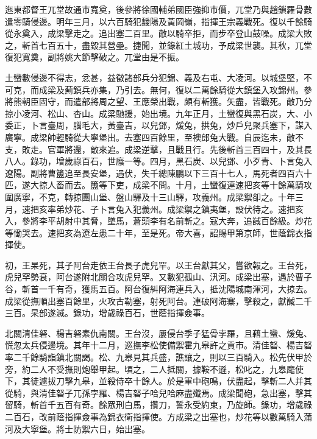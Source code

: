 \begin{pinyinscope}
迤東都督王兀堂故通市寬奠，後參將徐國輔弟國臣強抑市價，兀堂乃與趙鎖羅骨數遣零騎侵邊。明年三月，以六百騎犯靉陽及黃岡嶺，指揮王宗義戰死。復以千餘騎從永奠入，成梁擊走之。追出塞二百里。敵以騎卒拒，而步卒登山鼓噪。成梁大敗之，斬首七百五十，盡毀其營壘。捷聞，並錄紅土城功，予成梁世襲。其秋，兀堂復犯寬奠，副將姚大節擊破之。兀堂由是不振。

土蠻數侵邊不得志，忿甚，益徵諸部兵分犯錦、義及右屯、大凌河。以城堡堅，不可克，而成梁及薊鎮兵亦集，乃引去。無何，復以二萬餘騎從大鎮堡入攻錦州。參將熊朝臣固守，而遣部將周之望、王應榮出戰，頗有斬獲。矢盡，皆戰死。敵乃分掠小凌河、松山、杏山。成梁馳援，始出境。九年正月，土蠻復與黑石炭，大、小委正，卜言臺周，腦毛大，黃臺吉，以兒鄧，煖兔，拱兔，炒戶兒聚兵塞下，謀入廣寧。成梁帥輕騎從大寧堡出。去塞四百餘里，至襖郎兔大戰。自辰迄未，敵不支，敗走。官軍將還，敵來追。成梁逆擊，且戰且行。先後斬首三百四十，及其長八人。錄功，增歲祿百石，世廕一等。四月，黑石炭、以兒鄧、小歹青、卜言兔入遼陽。副將曹簠追至長安堡，遇伏，失千總陳鵬以下三百十七人，馬死者四百六十匹，遂大掠人畜而去。簠等下吏，成梁不問。十月，土蠻復連速把亥等十餘萬騎攻圍廣寧，不克，轉掠團山堡、盤山驛及十三山驛，攻義州。成梁禦卻之。十年三月，速把亥率弟炒花、子卜言兔入犯義州。成梁禦之鎮夷堡，設伏待之。速把亥入，參將李平胡射中其脅，墜馬，蒼頭李有名前斬之。寇大奔，追馘百餘級。炒花等慟哭去。速把亥為遼左患二十年，至是死。帝大喜，詔賜甲第京師，世蔭錦衣指揮使。

初，王杲死，其子阿台走依王台長子虎兒罕。以王台獻其父，嘗欲報之。王台死，虎兒罕勢衰，阿台遂附北關合攻虎兒罕。又數犯孤山、汛河。成梁出塞，遇於曹子谷，斬首一千有奇，獲馬五百。阿台復糾阿海連兵入，抵沈陽城南渾河，大掠去。成梁從撫順出塞百餘里，火攻古勒塞，射死阿台。連破阿海寨，擊殺之，獻馘二千三百。杲部遂滅。錄功，增歲祿百石，世蔭指揮僉事。

北關清佳砮、楊吉砮素仇南關。王台沒，屢侵台季子猛骨孛羅，且藉土蠻、煖兔、慌忽太兵侵邊境。其年十二月，巡撫李松使備禦霍九皋許之貢市。清佳砮、楊吉砮率二千餘騎詣鎮北關謁。松、九皋見其兵盛，譙讓之，則以三百騎入。松先伏甲於旁，約二人不受撫則炮舉甲起。頃之，二人抵關，據鞍不遜，松叱之，九皋麾使下，其徒遽拔刀擊九皋，並殺侍卒十餘人。於是軍中砲鳴，伏盡起，擊斬二人并其從騎，與清佳砮子兀孫孛羅、楊吉砮子哈兒哈麻盡殲焉。成梁聞砲，急出塞，擊其留騎，斬首千五百有奇。餘眾刑白馬，攢刀，誓永受約束，乃旋師。錄功，增歲祿二百石，改前蔭指揮僉事為錦衣衛指揮使。方成梁之出塞也，炒花等以數萬騎入蒲河及大寧堡。將士防禦六日，始出塞。


\end{pinyinscope}
